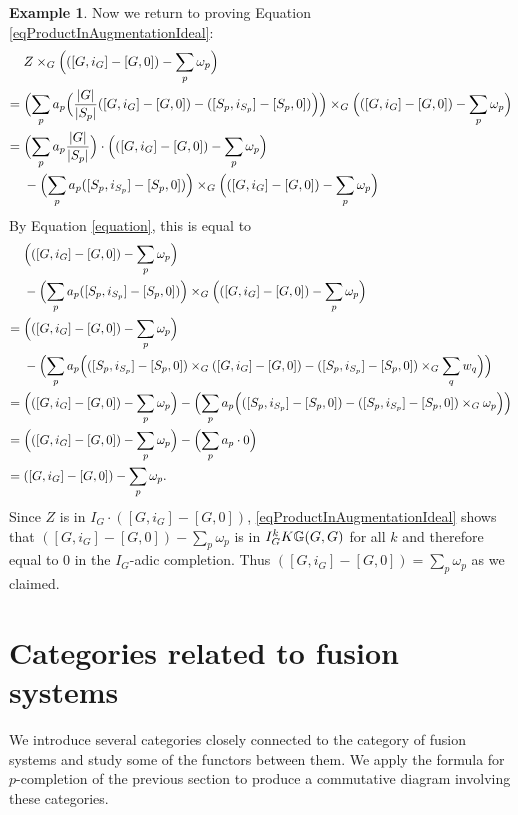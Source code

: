 \documentclass[10pt]{amsart}
\theoremstyle{definition}
\newtheorem{example}[theorem]{Example}
\begin{document}
\begin{example}
Now we return to proving Equation \eqref{eqProductInAugmentationIdeal}:
\begin{align*}
&Z \times_G \Bigl( ( [G, i_G] - [G,0] ) - \sum_p \omega_p \Bigr)
\\={}& \Bigl( \sum_p a_p \Bigl( \frac{\lvert G\rvert}{\lvert S_p\rvert} ( [G, i_G] - [G,0] ) - ( [S_p, i_{S_p}] - [S_p,0] ) \Bigr) \Bigr) \times_G \Bigl( ( [G, i_G] - [G,0] ) - \sum_p \omega_p \Bigr)
\\  ={}& \Bigl(\sum_p a_p \frac{\lvert G\rvert}{\lvert S_p\rvert} \Bigr) \cdot \Bigl( ( [G, i_G] - [G,0] ) - \sum_p \omega_p \Bigr)
\\ &- \Bigl( \sum_p a_p ( [S_p, i_{S_p}] - [S_p,0] ) \Bigr) \times_G \Bigl( ( [G, i_G] - [G,0] ) - \sum_p \omega_p \Bigr)
\end{align*}
By Equation \ref{equation}, this is equal to
\begin{align*}
& \Bigl( ( [G, i_G] - [G,0] ) - \sum_p \omega_p \Bigr)
\\ & -  \Bigl( \sum_p a_p ( [S_p, i_{S_p}] - [S_p,0] ) \Bigr) \times_G \Bigl( ( [G, i_G] - [G,0] ) - \sum_p \omega_p \Bigr)
\\ ={}& \Bigl( ( [G, i_G] - [G,0] ) - \sum_p \omega_p \Bigr)
\\ & -  \Bigl( \sum_p a_p \Bigl(( [S_p, i_{S_p}] - [S_p,0] ) \times_G ( [G, i_G] - [G,0] ) - ( [S_p, i_{S_p}] - [S_p,0] ) \times_G \sum_q w_q \Bigr) \Bigr)
\\ ={}& \Bigl( ( [G, i_G] - [G,0] ) - \sum_p \omega_p \Bigr)  -  \Bigl( \sum_p a_p \Bigl(( [S_p, i_{S_p}] - [S_p,0] )  - ( [S_p, i_{S_p}] - [S_p,0] ) \times_G \omega_p \Bigr) \Bigr)
\\ ={}& \Bigl( ( [G, i_G] - [G,0] ) - \sum_p \omega_p \Bigr)  -  \Bigl( \sum_p a_p \cdot 0 \Bigr)
\\ ={}& ( [G, i_G] - [G,0] ) - \sum_p \omega_p.
\end{align*}
Since $Z$ is in $I_G\cdot ([G,i_G]-[G,0])$, \eqref{eqProductInAugmentationIdeal} shows that $( [G, i_G] - [G,0] ) - \sum_p \omega_p$ is in $I_G^k K \mathbb{G}(G,G)$ for all $k$ and therefore equal to $0$ in the $I_G$-adic completion. Thus $( [G, i_G] - [G,0] ) = \sum_p \omega_p$ as we claimed.
\end{example}


\appendix

\section{Categories related to fusion systems}\label{sectionCategories}
We introduce several categories closely connected to the category of fusion systems and study some of the functors between them. We apply the formula for $p$-completion of the previous section to produce a commutative diagram involving these categories.
\end{document}
